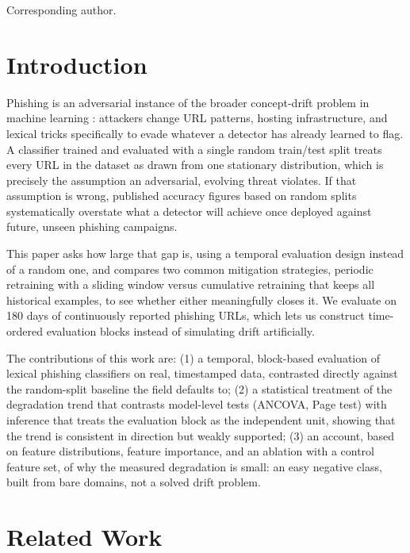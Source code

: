 \documentclass[10pt, a4paper, oneside]{article}
\begin{document}
{\fontsize{9pt}{11pt}\selectfont *Corresponding author.}

\section{Introduction}

Phishing is an adversarial instance of the broader concept-drift problem in machine learning \cite{gama2014survey}: attackers change URL patterns, hosting infrastructure, and lexical tricks specifically to evade whatever a detector has already learned to flag. A classifier trained and evaluated with a single random train/test split treats every URL in the dataset as drawn from one stationary distribution, which is precisely the assumption an adversarial, evolving threat violates. If that assumption is wrong, published accuracy figures based on random splits systematically overstate what a detector will achieve once deployed against future, unseen phishing campaigns.

This paper asks how large that gap is, using a temporal evaluation design instead of a random one, and compares two common mitigation strategies, periodic retraining with a sliding window versus cumulative retraining that keeps all historical examples, to see whether either meaningfully closes it. We evaluate on 180 days of continuously reported phishing URLs, which lets us construct time-ordered evaluation blocks instead of simulating drift artificially.

The contributions of this work are: (1) a temporal, block-based evaluation of lexical phishing classifiers on real, timestamped data, contrasted directly against the random-split baseline the field defaults to; (2) a statistical treatment of the degradation trend that contrasts model-level tests (ANCOVA, Page test) with inference that treats the evaluation block as the independent unit, showing that the trend is consistent in direction but weakly supported; (3) an account, based on feature distributions, feature importance, and an ablation with a control feature set, of why the measured degradation is small: an easy negative class, built from bare domains, not a solved drift problem.

\section{Related Work}
\end{document}
